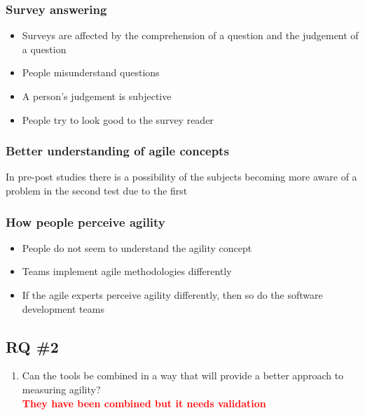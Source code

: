 \clearpage

\subsubsection{Survey answering}

\begin{itemize}
	\item Surveys are affected by the comprehension of a question and the judgement of a question \cite{Wagner_Zeglovits}
	\item People misunderstand questions
	\item A person's judgement is subjective
	\item People try to look good to the survey reader \cite{feldt_angelis_torkar_samuelsson}
\end{itemize}

\clearpage

\subsubsection{Better understanding of agile concepts}

In pre-post studies there is a possibility of the subjects becoming more aware of a problem in the second test due to the first

\clearpage

\subsubsection{How people perceive agility}

\begin{itemize}
	\item People do not seem to understand the agility concept
	\item Teams implement agile methodologies differently
	\item If the agile experts perceive agility differently, then so do the software development teams
\end{itemize}

\clearpage

\subsection{RQ \#2}

\begin{enumerate}
	\setcounter{enumi}{\theenumTemp}
	\item Can the tools be combined in a way that will provide a better approach to measuring agility? \\ \textcolor{red}{\textbf{They have been combined but it needs validation}}
\end{enumerate}

\clearpage